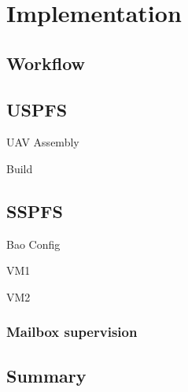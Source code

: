 %
\chapter{Implementation}
\label{cha:implementation}

\section{Workflow}
\label{sec:workflow}

\section{USPFS}
\label{sec:uspfs-implem}

UAV Assembly

Build

\section{SSPFS}
\label{sec:sspfs-implem}

Bao Config

VM1

VM2

\subsection{Mailbox supervision}
\label{sec:mailbox-supervision}



\section{Summary}
\label{sec:summary-implem}



